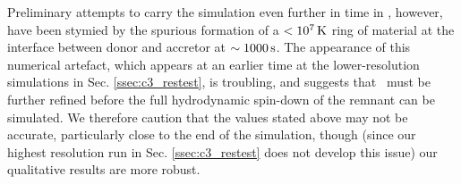 Preliminary attempts to carry the simulation even further in time in \arepo, however, have been stymied by the spurious formation of a $<10^7\,\mathrm{K}$ ring of material at the interface between donor and accretor at $\sim1000\,\mathrm{s}$.  The appearance of this numerical artefact, which appears at an earlier time at the lower-resolution simulations in Sec. \ref{ssec:c3_restest}, is troubling, and suggests that \arepo\ must be further refined before the full hydrodynamic spin-down of the remnant can be simulated.  We therefore caution that the values stated above may not be accurate, particularly close to the end of the simulation, though (since our highest resolution run in Sec. \ref{ssec:c3_restest} does not develop this issue) our qualitative results are more robust.




